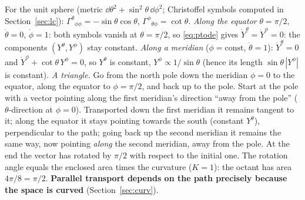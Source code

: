 \begin{example}
For the unit sphere (metric $\dd\theta^2+\sin^2\theta\,\dd\phi^2$; Christoffel symbols computed in Section~\ref{sec:lc}): $\Gamma^\theta{}_{\phi\phi}=-\sin\theta\cos\theta$, $\Gamma^\phi{}_{\theta\phi}=\cot\theta$. 
\emph{Along the equator} $\theta=\pi/2$, $\dot\theta=0$, $\dot\phi=1$: both symbols vanish at $\theta=\pi/2$, so \eqref{eq:ptode} gives $\dot Y^\theta=\dot Y^\phi=0$: the components $(Y^\theta,Y^\phi)$ stay constant.
\emph{Along a meridian} ($\phi=\mathrm{const}$, $\dot\theta=1$): $\dot Y^\theta=0$ and $\dot Y^\phi+\cot\theta\,Y^\phi=0$, so $Y^\theta$ is constant, $Y^\phi\propto 1/\sin\theta$ (hence its length $\sin\theta\,|Y^\phi|$ is constant).
\emph{A triangle.} Go from the north pole down the meridian $\phi=0$ to the equator, along the equator to $\phi=\pi/2$, and back up to the pole. Start at the pole with a vector pointing along the first meridian's direction ``away from the pole'' ($\theta$-direction at $\phi=0$). Transported down the first meridian it remains tangent to it; along the equator it stays pointing towards the south (constant $Y^\theta$), perpendicular to the path; going back up the second meridian it remains the same way, now pointing \emph{along} the second meridian, away from the pole. At the end the vector has rotated by $\pi/2$ with respect to the initial one. The rotation angle equals the enclosed area times the curvature ($K=1$): the octant has area $4\pi/8=\pi/2$. \textbf{Parallel transport depends on the path precisely because the space is curved} (Section~\ref{sec:curv}).
\end{example}
